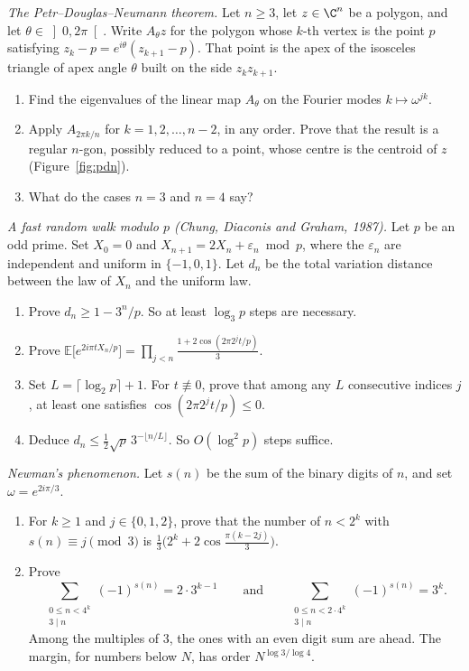 \begin{exercise}[$\star\star\star$]\label{pb:pdn}
\emph{The Petr--Douglas--Neumann theorem.} Let $n\ge3$, let $z\in\C^n$ be a polygon, and let $\theta\in\left]0,2\pi\right[$. Write $A_\theta z$ for the polygon whose $k$-th vertex is the point $p$ satisfying $z_k-p=e^{i\theta}(z_{k+1}-p)$. That point is the apex of the isosceles triangle of apex angle $\theta$ built on the side $z_kz_{k+1}$.
\begin{enumerate}[label=(\alph*)]
\item Find the eigenvalues of the linear map $A_\theta$ on the Fourier modes $k\mapsto\omega^{jk}$.
\item Apply $A_{2\pi k/n}$ for $k=1,2,\dots,n-2$, in any order. Prove that the result is a regular $n$-gon, possibly reduced to a point, whose centre is the centroid of $z$ (Figure~\ref{fig:pdn}).
\item What do the cases $n=3$ and $n=4$ say?
\end{enumerate}
\end{exercise}

\begin{exercise}[$\star\star\star$]\label{pb:cdg}
\emph{A fast random walk modulo $p$ (Chung, Diaconis and Graham, 1987).} Let $p$ be an odd prime. Set $X_0=0$ and $X_{n+1}=2X_n+\varepsilon_n\bmod p$, where the $\varepsilon_n$ are independent and uniform in $\{-1,0,1\}$. Let $d_n$ be the total variation distance between the law of $X_n$ and the uniform law.
\begin{enumerate}[label=(\alph*)]
\item Prove $d_n\ge1-3^n/p$. So at least $\log_3p$ steps are necessary.
\item Prove $\mathbb E\bigl[e^{2i\pi tX_n/p}\bigr]=\prod_{j<n}\frac{1+2\cos(2\pi2^jt/p)}3$.
\item Set $L=\lceil\log_2p\rceil+1$. For $t\not\equiv0$, prove that among any $L$ consecutive indices $j$, at least one satisfies $\cos(2\pi2^jt/p)\le0$.
\item Deduce $d_n\le\frac12\sqrt p\,3^{-\lfloor n/L\rfloor}$. So $O(\log^2p)$ steps suffice.
\end{enumerate}
\end{exercise}

\begin{exercise}[$\star\star$]\label{pb:newman}
\emph{Newman's phenomenon.} Let $s(n)$ be the sum of the binary digits of $n$, and set $\omega=e^{2i\pi/3}$.
\begin{enumerate}[label=(\alph*)]
\item For $k\ge1$ and $j\in\{0,1,2\}$, prove that the number of $n<2^k$ with $s(n)\equiv j\pmod3$ is $\frac13\bigl(2^k+2\cos\frac{\pi(k-2j)}3\bigr)$.
\item Prove
\[
\sum_{\substack{0\le n<4^k\\3\mid n}}(-1)^{s(n)}=2\cdot3^{k-1}\qquad\text{and}\qquad\sum_{\substack{0\le n<2\cdot4^k\\3\mid n}}(-1)^{s(n)}=3^k.
\]
Among the multiples of $3$, the ones with an even digit sum are ahead. The margin, for numbers below $N$, has order $N^{\log3/\log4}$.
\end{enumerate}
\end{exercise}

